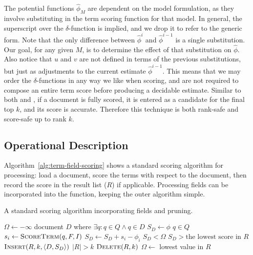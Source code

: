 \documentclass{sig-alternate}
\newcommand{\method}[1]{{\sc{#1}}}
\newcommand{\daat}{{\method{daat}}}
\begin{document}
The potential functions ${\hat \phi_{M}}$ are dependent on the model formulation, as they involve substituting in the term scoring function for that model. In general, the superscript over the $\delta$-function is implied, and we drop it to refer to the generic form. Note that the only difference between ${\hat \phi^{i}}$ and ${\hat \phi^{i-1}}$ is a single substitution. Our goal, for any given $M$, is to determine the effect of that substitution on ${\hat \phi}$. Also notice that $u$ and $v$ are not defined in terms of the previous substitutions, but just as adjustments to the current estimate ${\hat \phi^{i-1}}$. This means that we may order the $\delta$-functions in any way we like when scoring, and are not required to compose an entire term score before producing a decidable estimate. Similar to both \method{maxscore} and \method{wand}, if a document is fully scored, it is entered as a candidate for the final top $k$, and its score is accurate. Therefore this technique is both rank-safe and score-safe up to rank $k$.
\subsection{Operational Description}
Algorithm~\ref{alg:term-field-scoring} shows a standard scoring algorithm for {\daat} processing: load a document, score the terms with respect to the document, then
record the score in the result list ($R$) if applicable. Processing fields can be incorporated into the  function, keeping the outer algorithm simple.  
\begin{algorithm}[t!]
\caption{A standard {\daat} scoring algorithm incorporating fields and pruning.}
\label{alg:term-field-scoring}
\begin{codebox}
\li $\Omega \gets -\infty$
\li {} document $D$ where $\exists q : q \in Q \wedge q \in D$
\li 	\Do
	$S_{D} \gets \phi$
\li	{} $q \in Q$
\li	\Do
		$s_{i} \gets \textnormal{\scshape ScoreTerm}(q, F, I)$
\li		$S_{D} \gets S_{D} + s_{i} - \phi_{i}$
\li		\If $S_{D} < \Omega$
\li		\Then
		\End		
	\End
\li	\If $S_{D} > \text{the lowest score in $R$}$
\li	\Then
		$\textnormal{\scshape Insert}(R, k, \langle D, S_{D} \rangle)$
	\End
\li	\If $|R| > k$
\li	\Then
		$\textnormal{\scshape Delete}(R, k)$
\li		$\Omega \gets$ lowest value in $R$
	\End
   \End
\li \Return {}
\end{codebox}
\end{algorithm}
\end{document}

